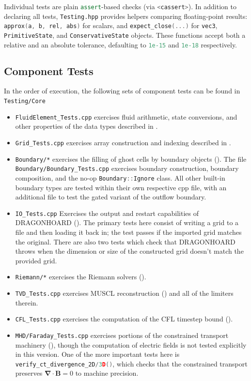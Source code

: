 \documentclass[11pt]{report}
\newcommand{\cpp}[1]{\lstinline[language=C++]{#1}}
\newcommand{\bash}[1]{\lstinline[language=bash]{#1}}
\begin{document}
Individual tests are plain \cpp{assert}-based checks (via \bash{<cassert>}). In addition to declaring all tests, \bash{Testing.hpp} provides helpers comparing floating-point results: \cpp{approx(a, b, rel, abs)} for scalars, and \cpp{expect_close(...)} for \cpp{vec3}, \cpp{PrimitiveState}, and \cpp{ConservativeState} objects. These functions accept both a relative and an absolute tolerance, defaulting to \cpp{1e-15} and \cpp{1e-18} respectively. 


\subsection{Component Tests}
In the order of execution, the following sets of component tests can be found in \bash{Testing/Core}
\begin{itemize}
\item \bash{FluidElement_Tests.cpp} exercises fluid arithmetic, state conversions, and other properties of the data types described in .
\item \bash{Grid_Tests.cpp} exercises array construction and indexing described in .
\item \bash{Boundary/*} exercises the filling of ghost cells by boundary objects (). The file \bash{Boundary/Boundary_Tests.cpp} exercises boundary construction, boundary composition, and the no-op \cpp{Boundary::Ignore} class. All other built-in boundary types are tested within their own respective cpp file, with an additional file to test the gated variant of the outflow boundary.
\item \bash{IO_Tests.cpp} Exercises the output and restart capabilities of DRAGONHOARD (). The primary tests here consist of writing a grid to a file and then loading it back in; the test passes if the imported grid matches the original.  There are  also two tests which check that DRAGONHOARD throws when the dimension or size of the constructed grid  doesn't match the provided grid.

\item \bash{Riemann/*} exercises the Riemann solvers ().
\item \bash{TVD_Tests.cpp} exercises MUSCL reconstruction () and all of the limiters therein.
\item \bash{CFL_Tests.cpp} exercises the computation of the CFL timestep bound ().

\item \bash{MHD/Faraday_Tests.cpp} exercises portions of the constrained transport machinery (), though the computation of electric fields is not tested explicitly in this version. One of the more important tests here is \cpp{verify_ct_divergence_2D/3D()}, which checks that the constrained transport preserves $\mathbf{ \nabla\cdot B} = 0$ to machine precision.
\end{itemize}
\end{document}
